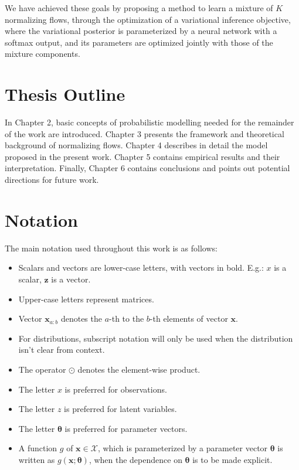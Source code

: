We have achieved these goals by proposing a method to learn a mixture of
$K$ normalizing flows, through the optimization of a variational inference
objective, where the variational posterior is parameterized by a neural network
with a softmax output, and its parameters are optimized jointly with those of
the mixture components.

\section{Thesis Outline}
\label{section:outline}

In Chapter 2, basic concepts of probabilistic modelling needed for the remainder
of the work are introduced. Chapter 3 presents the framework and theoretical background
of normalizing flows. Chapter 4 describes in detail the model
proposed in the present work. Chapter 5 contains empirical results and their
interpretation. Finally, Chapter 6 contains conclusions and points out potential
directions for future work.

\section{Notation}
\label{section:notation}
The main notation used throughout this work is as follows:

\begin{itemize}
    \item Scalars and vectors are lower-case letters, with vectors in bold. E.g.:
    $x$ is a scalar, $\mathbf{z}$ is a vector.
    \item Upper-case letters represent matrices.
    \item Vector $\bm{x}_{a:b}$ denotes the $a$-th to the $b$-th elements
    of vector $\bm{x}$.
    \item For distributions, subscript notation will only be used when the
distribution isn't clear from context.
    \item The operator $\odot$ denotes the element-wise product.
    \item The letter $x$ is preferred for observations.
    \item The letter $z$ is preferred for latent variables.
    \item The letter $\bm\theta$ is preferred for parameter vectors.
    \item A function $g$ of $\bm{x} \in \bm{\mathcal{X}}$, which is parameterized
    by a parameter vector $\bm\theta$ is written as $g(\bm{x};\bm\theta)$, when
    the dependence on $\bm\theta$ is to be made explicit.
\end{itemize}
